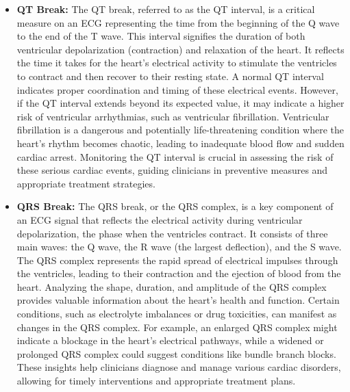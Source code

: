 \begin{itemize}
    \item \textbf{QT Break:} The QT break, referred to as the QT interval, is a critical measure on an ECG representing the time from the beginning of the Q wave to the end of the T wave. This interval signifies the duration of both ventricular depolarization (contraction) and relaxation of the heart. It reflects the time it takes for the heart's electrical activity to stimulate the ventricles to contract and then recover to their resting state. A normal QT interval indicates proper coordination and timing of these electrical events. However, if the QT interval extends beyond its expected value, it may indicate a higher risk of ventricular arrhythmias, such as ventricular fibrillation. Ventricular fibrillation is a dangerous and potentially life-threatening condition where the heart's rhythm becomes chaotic, leading to inadequate blood flow and sudden cardiac arrest. Monitoring the QT interval is crucial in assessing the risk of these serious cardiac events, guiding clinicians in preventive measures and appropriate treatment strategies.
    \item \textbf{QRS Break:} The QRS break, or the QRS complex, is a key component of an ECG signal that reflects the electrical activity during ventricular depolarization, the phase when the ventricles contract. It consists of three main waves: the Q wave, the R wave (the largest deflection), and the S wave. The QRS complex represents the rapid spread of electrical impulses through the ventricles, leading to their contraction and the ejection of blood from the heart. Analyzing the shape, duration, and amplitude of the QRS complex provides valuable information about the heart's health and function. Certain conditions, such as electrolyte imbalances or drug toxicities, can manifest as changes in the QRS complex. For example, an enlarged QRS complex might indicate a blockage in the heart's electrical pathways, while a widened or prolonged QRS complex could suggest conditions like bundle branch blocks. These insights help clinicians diagnose and manage various cardiac disorders, allowing for timely interventions and appropriate treatment plans.
\end{itemize}
